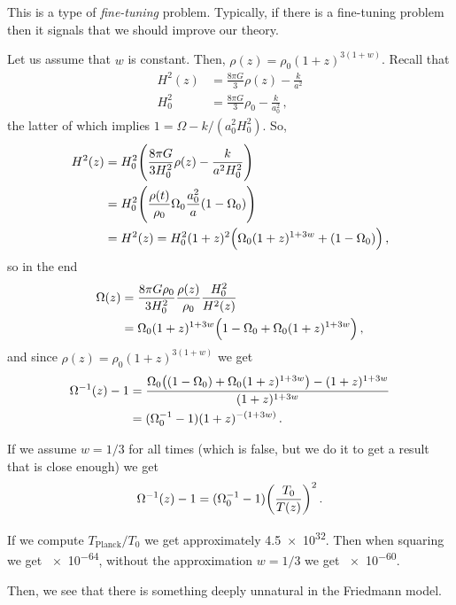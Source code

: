 \documentclass[main.tex]{subfiles}
\begin{document}
This is a type of \emph{fine-tuning} problem. Typically, if there is a fine-tuning problem then it signals that we should improve our theory.

Let us assume that \(w\) is constant. Then, \(\rho (z) = \rho_{0} (1+z)^{3(1+w)}\). Recall that 
%
\begin{subequations}
\begin{align}
  H^2(z) &= \frac{8 \pi G }{3} \rho (z) - \frac{k}{a^2}  \\
  H_0^2 &= \frac{8 \pi G}{3}\rho_0 - \frac{k}{a_0^2}
\,,
\end{align}
\end{subequations}
%
the latter of which implies \(1 = \Omega - k / (a_0^2 H_0^2)\). So, 
%
\begin{subequations}
\begin{align}
  H^2(z) &= H_0^2 \qty(\frac{8 \pi G }{3 H_0^2} \rho (z) - \frac{k}{a^2 H_0^2}) \\
  &= H_0^2 \qty(\frac{\rho (t)}{\rho_0 }\Omega_0 \frac{a_0^2}{a} (1-\Omega_0 ))  \\
  &= H^2(z) = H_0^2 (1+z)^2 \qty(\Omega_0 (1+z)^{1+3w} + (1-\Omega_0 ))
\,,
\end{align}
\end{subequations}
%
so in the end 
%
\begin{subequations}
\begin{align}
  \Omega (z) &= \frac{8 \pi G \rho_0 }{3 H_0^2 } \frac{\rho (z)}{\rho_0 } \frac{H_0^2}{H^2(z)} \\
  &=\Omega_0 (1+z)^{1+3w} \qty(1-\Omega_0 + \Omega_0 (1+z)^{1+3w}) 
\,,
\end{align}
\end{subequations}
%
and since \(\rho (z) = \rho_0 (1+z)^{3(1+w)}\) we get 
%
\begin{subequations}
\begin{align}
  \Omega^{-1} (z) -1 &= \frac{\Omega_0 \qty((1-\Omega_0 ) + \Omega_0 (1+z)^{1+3w}) - (1+z)^{1+3w} }{(1+z)^{1+3w}}  \\
  &= (\Omega_0^{-1} -1) (1+z)^{-(1+3w)}
\,.
\end{align}
\end{subequations}

If we assume \(w = 1/3\) for all times (which is false, but we do it to get a result that is close enough) we get 
%
\begin{align}
  \Omega ^{-1} (z) -1= (\Omega_0 ^{-1} -1) \qty(\frac{T_0 }{T(z)})^{2}
\,.
\end{align}

If we compute \(T _{\text{Planck}} / T_0 \) we get approximately \num{4.5e32}. Then when squaring we get \num{e-64}, without the approximation \(w=1/3\) we get \num{e-60}.

Then, we see that there is something deeply unnatural in the Friedmann model.
\end{document}
